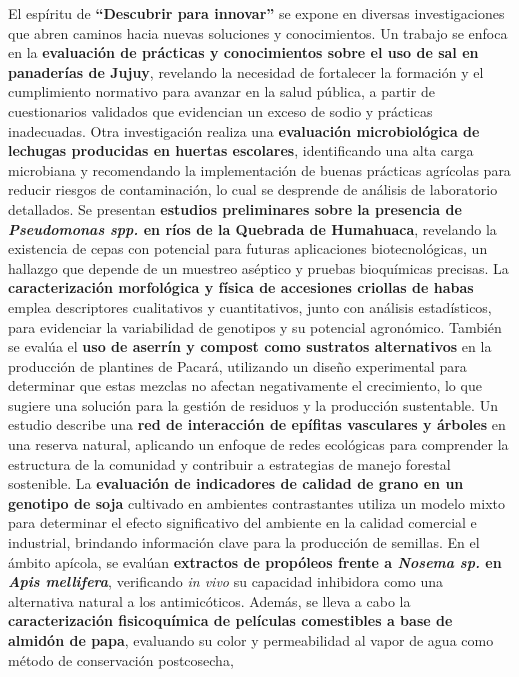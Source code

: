 \documentclass[
  spanish,
  letterpaper,
  DIV=11,
  numbers=noendperiod]{scrreprt}
\begin{document}
El espíritu de \textbf{``Descubrir para innovar''} se expone en diversas
investigaciones que abren caminos hacia nuevas soluciones y
conocimientos. Un trabajo se enfoca en la \textbf{evaluación de
prácticas y conocimientos sobre el uso de sal en panaderías de Jujuy},
revelando la necesidad de fortalecer la formación y el cumplimiento
normativo para avanzar en la salud pública, a partir de cuestionarios
validados que evidencian un exceso de sodio y prácticas inadecuadas.
Otra investigación realiza una \textbf{evaluación microbiológica de
lechugas producidas en huertas escolares}, identificando una alta carga
microbiana y recomendando la implementación de buenas prácticas
agrícolas para reducir riesgos de contaminación, lo cual se desprende de
análisis de laboratorio detallados. Se presentan \textbf{estudios
preliminares sobre la presencia de \emph{Pseudomonas spp.} en ríos de la
Quebrada de Humahuaca}, revelando la existencia de cepas con potencial
para futuras aplicaciones biotecnológicas, un hallazgo que depende de un
muestreo aséptico y pruebas bioquímicas precisas. La
\textbf{caracterización morfológica y física de accesiones criollas de
habas} emplea descriptores cualitativos y cuantitativos, junto con
análisis estadísticos, para evidenciar la variabilidad de genotipos y su
potencial agronómico. También se evalúa el \textbf{uso de aserrín y
compost como sustratos alternativos} en la producción de plantines de
Pacará, utilizando un diseño experimental para determinar que estas
mezclas no afectan negativamente el crecimiento, lo que sugiere una
solución para la gestión de residuos y la producción sustentable. Un
estudio describe una \textbf{red de interacción de epífitas vasculares y
árboles} en una reserva natural, aplicando un enfoque de redes
ecológicas para comprender la estructura de la comunidad y contribuir a
estrategias de manejo forestal sostenible. La \textbf{evaluación de
indicadores de calidad de grano en un genotipo de soja} cultivado en
ambientes contrastantes utiliza un modelo mixto para determinar el
efecto significativo del ambiente en la calidad comercial e industrial,
brindando información clave para la producción de semillas. En el ámbito
apícola, se evalúan \textbf{extractos de propóleos frente a \emph{Nosema
sp.} en \emph{Apis mellifera}}, verificando \emph{in vivo} su capacidad
inhibidora como una alternativa natural a los antimicóticos. Además, se
lleva a cabo la \textbf{caracterización fisicoquímica de películas
comestibles a base de almidón de papa}, evaluando su color y
permeabilidad al vapor de agua como método de conservación postcosecha,
\end{document}
